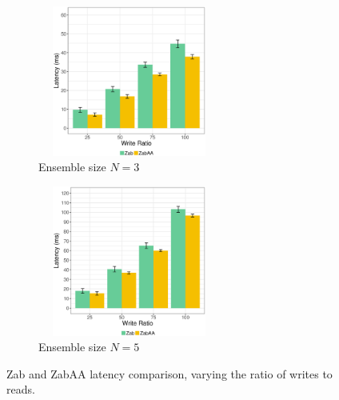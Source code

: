 \documentclass[a4paper,UKenglish]{oasics-v2016}
\begin{document}
\begin{figure}[h]
	\begin{subfigure}{.5\linewidth}
		\includegraphics[width=170pt,height=140pt, scale=0.39]{figuress/LN3_AA.eps}
		\caption{Ensemble size $N=3$}
		\label{LatencyAAN3}
	\end{subfigure}		
	\begin{subfigure}{.5\linewidth}
		\includegraphics[width=170pt,height=140pt, scale=0.39]{figuress/LN5_AA.eps}
		\caption{Ensemble size $N=5$}
		\label{LatencyAAN5}
	\end{subfigure}		
	\caption{Zab and ZabAA latency comparison, varying the ratio of writes to reads.}
	\label{latency comparisonN3}
\end{figure}
\end{document}
